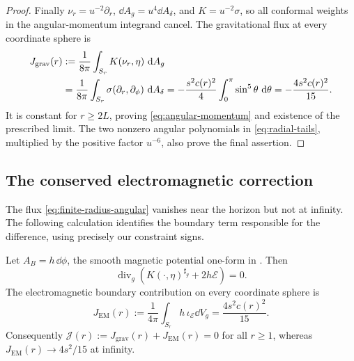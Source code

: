 \begin{proof}
Finally \(\nu_r=u^{-2}\partial_r\), \(\dd A_g=u^4\dd A_\delta\), and
\(K=u^{-2}\sigma\), so all conformal weights in the angular-momentum
integrand cancel. The gravitational flux at every coordinate sphere is
\begin{align}
 J_{\mathrm{grav}}(r)
  &:=\frac1{8\pi}\int_{S_r}K(\nu_r,\eta)\,\mathop{}\!\mathrm d A_g\notag\\
  &=\frac1{8\pi}\int_{S_r}\sigma(\partial_r,\partial_\phi)
           \,\mathop{}\!\mathrm d A_\delta
   =-\frac{s^2c(r)^2}{4}\int_0^\pi\sin^5\theta\,\mathop{}\!\mathrm d\theta
   =-\frac{4s^2c(r)^2}{15}.
   \label{eq:finite-radius-angular}
\end{align}
It is constant for \(r\ge2L\), proving \eqref{eq:angular-momentum} and
existence of the prescribed limit. The two nonzero angular polynomials in
\eqref{eq:radial-tails}, multiplied by the positive factor \(u^{-6}\), also
prove the final assertion.
\end{proof}

\subsection{The conserved electromagnetic correction}

The flux \eqref{eq:finite-radius-angular} vanishes near the horizon but
not at infinity. The following calculation identifies the boundary term
responsible for the difference, using precisely our constraint signs.

\begin{proposition}\label{prop:corrected-flux}
Let \(A_B=h\,\dd\phi\), the smooth magnetic potential one-form in
. Then
\begin{equation}\label{eq:corrected-divergence}
 \operatorname{div}_g\left(K(\cdot,\eta)^{\sharp_g}
                              +2h\mathcal E\right)=0.
\end{equation}
The electromagnetic boundary contribution on every coordinate sphere is
\begin{equation}\label{eq:electromagnetic-correction}
 J_{\mathrm{EM}}(r)
 :=\frac1{4\pi}\int_{S_r}h\,\iota_{\mathcal E}\dd V_g
 =\frac{4s^2c(r)^2}{15}.
\end{equation}
Consequently \(\mathcal J(r):=J_{\mathrm{grav}}(r)+J_{\mathrm{EM}}(r)=0\)
for all \(r\ge1\), whereas \(J_{\mathrm{EM}}(r)\to4s^2/15\) at infinity.
\end{proposition}

